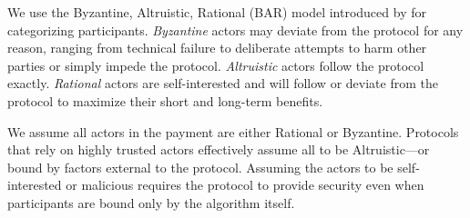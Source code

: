\documentclass[letterpaper,twocolumn,10pt]{article}
\begin{document}
We use the Byzantine, Altruistic, Rational (BAR) model introduced by \cite{aiyer2005bar} for categorizing participants. \textit{Byzantine} actors may deviate from the protocol for any reason, ranging from technical failure to deliberate attempts to harm other parties or simply impede the protocol. \textit{Altruistic} actors follow the protocol exactly. \textit{Rational} actors are self-interested and will follow or deviate from the protocol to maximize their short and long-term benefits.

We assume all actors in the payment are either Rational or Byzantine. Protocols that rely on highly trusted actors effectively assume all to be Altruistic---or bound by factors external to the protocol. Assuming the actors to be self-interested or malicious requires the protocol to provide security even when participants are bound only by the algorithm itself.




\end{document}
